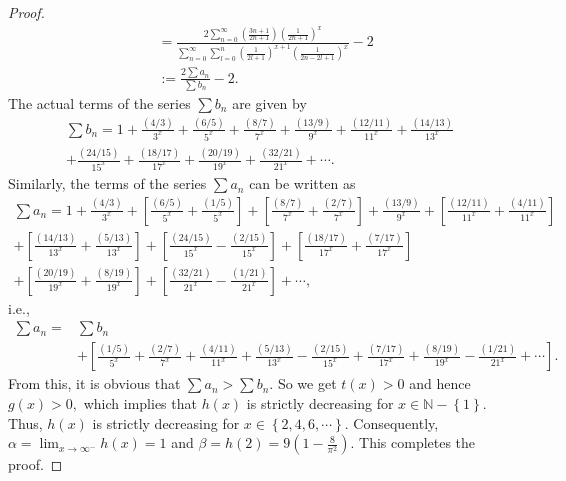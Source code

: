 \documentclass[eqnumis, pdf]{yjb}
\begin{document}
\begin{proof}
\begin{align*}
&= \frac{2 \sum_{n=0}^\infty \left(\frac{3n+1}{2n+1}\right) \left(\frac{1}{2n+1}\right)^x}{\sum_{n=0}^\infty\sum_{l=0}^n  \left(\frac{1}{2l+1}\right)^{x+1} \left(\frac{1}{2n-2l+1}\right)^x } - 2 \\
&:= \frac{2 \sum a_n}{\sum b_n} - 2.
\end{align*} 
The actual terms of the series $ \sum b_n$ are given by
\begin{multline}\nonumber
\sum b_n = 1 + \frac{(4/3)}{3^x} + \frac{(6/5)}{5^x} + \frac{(8/7)}{7^x} + \frac{(13/9)}{9^x} + \frac{(12/11)}{11^x} + \frac{(14/13)}{13^x} \\
+ \frac{(24/15)}{15^x} + \frac{(18/17)}{17^x} + \frac{(20/19)}{19^x} + \frac{(32/21)}{21^x} + \cdots.
\end{multline}
Similarly, the terms of the series $ \sum a_n $ can be written as
\begin{multline}\nonumber
\sum a_n = 1 + \frac{(4/3)}{3^x} + \left[\frac{(6/5)}{5^x} + \frac{(1/5)}{5^x}\right] + \left[\frac{(8/7)}{7^x} + \frac{(2/7)}{7^x}\right] + \frac{(13/9)}{9^x} + \left[\frac{(12/11)}{11^x} + \frac{(4/11)}{11^x}\right] \\ + \left[\frac{(14/13)}{13^x} + \frac{(5/13)}{13^x}\right] + \left[\frac{(24/15)}{15^x} - \frac{(2/15)}{15^x}\right] + \left[\frac{(18/17)}{17^x} + \frac{(7/17)}{17^x}\right] \\
 + \left[\frac{(20/19)}{19^x} + \frac{(8/19)}{19^x}\right] + \left[\frac{(32/21)}{21^x} - \frac{(1/21)}{21^x}\right] + \cdots,
\end{multline}
i.e.,
\begin{align*}
\sum a_n = &\sum b_n \\
&+ \left[\frac{(1/5)}{5^x} + \frac{(2/7)}{7^x} + \frac{(4/11)}{11^x} + \frac{(5/13)}{13^x} - \frac{(2/15)}{15^x} + \frac{(7/17)}{17^x} + \frac{(8/19)}{19^x} - \frac{(1/21)}{21^x} + \cdots \right].
\end{align*}
From this, it is obvious that $ \sum a_n > \sum b_n. $ So we get $ t(x) > 0$ and hence $ g(x) > 0, $ which implies that $ h(x) $ is strictly decreasing for $ x \in \mathbb{N} - \left\lbrace 1 \right\rbrace.$ Thus, $ h(x) $ is strictly decreasing for $ x \in \left\lbrace 2, 4, 6, \cdots \right\rbrace.$ Consequently,
$ \alpha = \lim_{x \rightarrow \infty^-} h(x) = 1 $ and $ \beta = h(2) = 9\left(1-\frac{8}{\pi^2}\right). $ This completes the proof.
\end{proof}
\end{document}
